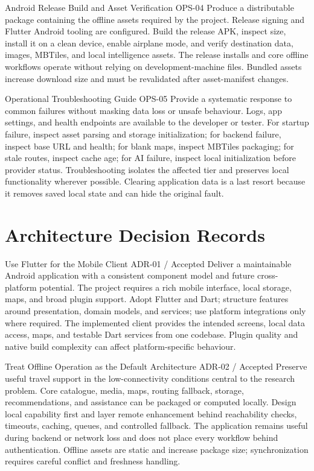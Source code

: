 \EvidenceSheet
{Android Release Build and Asset Verification}
{OPS-04}
{Produce a distributable package containing the offline assets required by the project.}
{Release signing and Flutter Android tooling are configured.}
{Build the release APK, inspect size, install it on a clean device, enable airplane mode, and verify destination data, images, MBTiles, and local intelligence assets.}
{The release installs and core offline workflows operate without relying on development-machine files.}
{Bundled assets increase download size and must be revalidated after asset-manifest changes.}

\EvidenceSheet
{Operational Troubleshooting Guide}
{OPS-05}
{Provide a systematic response to common failures without masking data loss or unsafe behaviour.}
{Logs, app settings, and health endpoints are available to the developer or tester.}
{For startup failure, inspect asset parsing and storage initialization; for backend failure, inspect base URL and health; for blank maps, inspect MBTiles packaging; for stale routes, inspect cache age; for AI failure, inspect local initialization before provider status.}
{Troubleshooting isolates the affected tier and preserves local functionality wherever possible.}
{Clearing application data is a last resort because it removes saved local state and can hide the original fault.}

\chapter{Architecture Decision Records}
\label{app:adrs}

\EvidenceSheet
{Use Flutter for the Mobile Client}
{ADR-01 / Accepted}
{Deliver a maintainable Android application with a consistent component model and future cross-platform potential.}
{The project requires a rich mobile interface, local storage, maps, and broad plugin support.}
{Adopt Flutter and Dart; structure features around presentation, domain models, and services; use platform integrations only where required.}
{The implemented client provides the intended screens, local data access, maps, and testable Dart services from one codebase.}
{Plugin quality and native build complexity can affect platform-specific behaviour.}

\EvidenceSheet
{Treat Offline Operation as the Default Architecture}
{ADR-02 / Accepted}
{Preserve useful travel support in the low-connectivity conditions central to the research problem.}
{Core catalogue, media, maps, routing fallback, storage, recommendations, and assistance can be packaged or computed locally.}
{Design local capability first and layer remote enhancement behind reachability checks, timeouts, caching, queues, and controlled fallback.}
{The application remains useful during backend or network loss and does not place every workflow behind authentication.}
{Offline assets are static and increase package size; synchronization requires careful conflict and freshness handling.}

